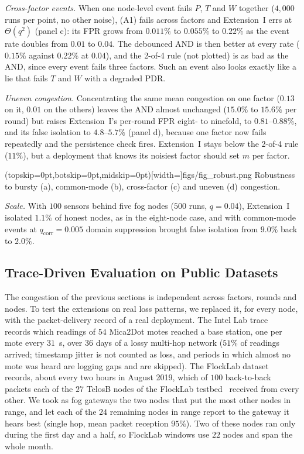 \emph{Cross-factor events.}  When one node-level event fails $P$, $T$
and $W$ together ($4{,}000$ runs per point, no other noise), (A1) fails
across factors and Extension~I errs at $\Theta(q^{2})$ (panel c): its
FPR grows from $0.011\%$ to $0.055\%$ to $0.22\%$ as the event rate
doubles from $0.01$ to $0.04$.  The debounced AND is then better
at every rate ($0.15\%$ against $0.22\%$ at $0.04$), and the 2-of-4 rule (not plotted) is as bad
as the AND, since every event fails three factors.  Such an event also
looks exactly like a lie that fails $T$ and $W$ with a degraded PDR.

\emph{Uneven congestion.}  Concentrating the same mean congestion on
one factor ($0.13$ on it, $0.01$ on the others) leaves the AND
almost unchanged ($15.0\%$ to $15.6\%$ per round) but raises Extension~I's per-round FPR eight- to ninefold, to
$0.81$--$0.88\%$, and its false isolation to $4.8$--$5.7\%$ (panel d),
because one factor now fails repeatedly and the persistence check
fires.  Extension~I stays below the 2-of-4 rule ($11\%$), but a
deployment that knows its noisiest factor should set $m$ per factor.

\Figure[!t](topskip=0pt,botskip=0pt,midskip=0pt)[width=\textwidth]{figs/fig_robust.png}
{Robustness to bursty (a), common-mode (b), cross-factor (c) and uneven (d) congestion.\label{fig:robust}}

\emph{Scale.}  With $100$ sensors behind five fog nodes ($500$ runs, $q=0.04$),
Extension~I isolated $1.1\%$ of honest nodes, as in the eight-node
case, and with common-mode events at $q_{\mathrm{corr}}=0.005$ domain
suppression brought false isolation from $9.0\%$ back to $2.0\%$.

\subsection{Trace-Driven Evaluation on Public Datasets}
\label{sec:res-trace}
The congestion of the previous sections is independent across factors,
rounds and nodes.  To test the extensions on real loss patterns, we
replaced it, for every node, with the packet-delivery record of a real
deployment.  The Intel Lab trace~\cite{bodik2004intel} records which
readings of $54$ Mica2Dot motes reached a base station, one per mote
every $31$~s, over $36$ days of a lossy multi-hop network ($51\%$ of
readings arrived; timestamp jitter is not counted as loss, and periods
in which almost no mote was heard are logging gaps and are skipped).
The FlockLab dataset~\cite{jacob2019flocklab} records, about every two
hours in August 2019, which of $100$ back-to-back packets each of the
$27$ TelosB nodes of the FlockLab testbed~\cite{lim2013flocklab}
received from every other.  We took as fog gateways the two nodes that
put the most other nodes in range, and let each of the $24$ remaining
nodes in range report to the gateway it hears best (single hop, mean
packet reception $95\%$).  Two of these nodes ran only during the first
day and a half, so FlockLab windows use $22$ nodes and span the whole
month.

